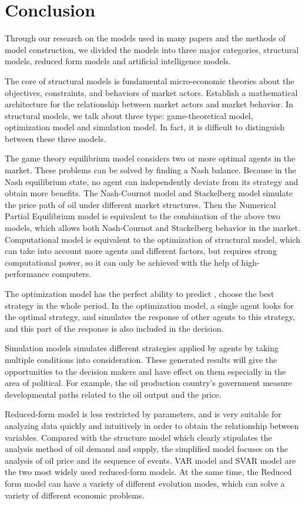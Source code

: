\chapter{Conclusion}
Through our research on the models used in many papers and the methods of model construction, we divided the models into three major categories, structural models, reduced form models and artificial intelligence models. 

The core of structural models is fundamental micro-economic theories about the objectives, constraints, and behaviors of market actors. Establish a mathematical architecture for the relationship between market actors and market behavior. In structural models, we talk about three type: game-theoretical model, optimization model and simulation model. In fact, it is difficult to distinguish between these three models.


The game theory equilibrium model considers two or more optimal agents in the market. These problems can be solved by finding a Nash balance. Because in the Nash equilibrium state, no agent can independently deviate from its strategy and obtain more benefits. The Nash-Cournot model and Stackelberg model simulate the price path of oil under different market structures. Then the Numerical Partial Equilibrium model is equivalent to the combination of the above two models, which allows both Nash-Cournot and Stackelberg behavior in the market. Computational model is equivalent to the optimization of structural model, which can take into account more agents and different factors, but requires strong computational power, so it can only be achieved with the help of high-performance computers.


The optimization model has the perfect ability to predict , choose the best strategy in the whole period. In the optimization model, a single agent looks for the optimal strategy, and simulates the response of other agents to this strategy, and this part of the response is also included in the decision.


Simulation models simulates different strategies applied by agents by taking multiple conditions into consideration. These generated results will give the opportunities to the decision makers and have effect on them especially in the area of political. For example, the oil production country's government measure developmental paths related to the oil output and the price. 

Reduced-form model is less restricted by parameters, and is very suitable for analyzing data quickly and intuitively in order to obtain the relationship between variables.  Compared with the structure model which clearly stipulates the analysis method of oil demand and supply, the simplified model focuses on the analysis of oil price and its sequence of events.  VAR model and SVAR model are the two most widely used reduced-form models. At the same time, the Reduced form model can have a variety of different evolution modes, which can solve a variety of different economic problems.

